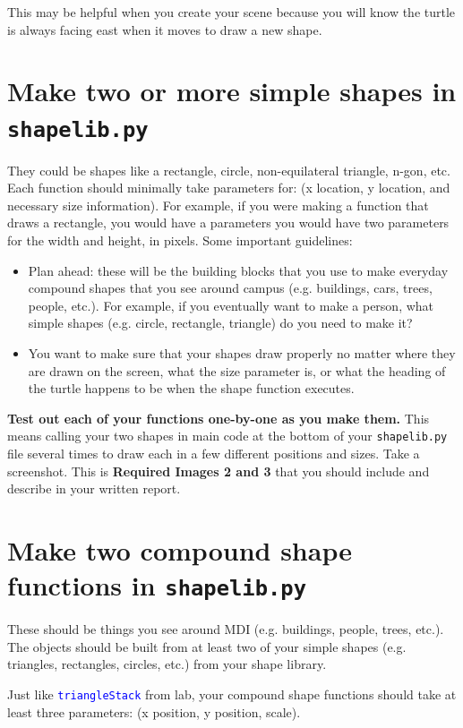 \documentclass[12pt]{article}
\begin{document}
This may be helpful when you create your scene because you will know the turtle is always facing east when it moves to draw a new shape.

\section{Make two or more simple shapes in \texttt{shapelib.py}}
They could be shapes like a rectangle, circle, non-equilateral triangle, n-gon, etc. Each function should minimally take parameters for: (x location, y location, and necessary size information).
For example, if you were making a function that draws a rectangle, you would have a parameters you would have two parameters for the width and height, in pixels.
Some important guidelines:
\begin{itemize}
\item Plan ahead: these will be the building blocks that you use to make everyday compound shapes that you see around campus (e.g. buildings, cars, trees, people, etc.). For example, if you eventually want to make a person, what simple shapes (e.g. circle, rectangle, triangle) do you need to make it?
\item You want to make sure that your shapes draw properly no matter where they are drawn on the screen, what the size parameter is, or what the heading of the turtle happens to be when the shape function executes.
\end{itemize}

\textbf{Test out each of your functions one-by-one as you make them.} This means calling your two shapes in main code at the bottom of your \texttt{shapelib.py} file several times to draw each in a few different positions and sizes.
Take a screenshot. This is \textbf{Required Images 2 and 3} that you should include and describe in your written report.

\section{Make two compound shape functions in \texttt{shapelib.py}}
These should be things you see around MDI (e.g. buildings, people, trees, etc.). The objects should be built from at least two of your simple shapes (e.g. triangles, rectangles, circles, etc.) from your shape library.

Just like \textcolor{blue}{\texttt{triangleStack}} from lab, your compound shape functions should take at least three parameters: (x position, y position, scale).
\end{document}

